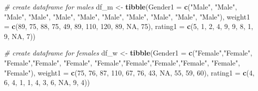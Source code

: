 \documentclass[
]{article}
\newenvironment{Shaded}{\begin{snugshade}}{\end{snugshade}}
\newcommand{\AttributeTok}[1]{\textcolor[rgb]{0.13,0.29,0.53}{#1}}
\newcommand{\CommentTok}[1]{\textcolor[rgb]{0.56,0.35,0.01}{\textit{#1}}}
\newcommand{\ConstantTok}[1]{\textcolor[rgb]{0.56,0.35,0.01}{#1}}
\newcommand{\DecValTok}[1]{\textcolor[rgb]{0.00,0.00,0.81}{#1}}
\newcommand{\FunctionTok}[1]{\textcolor[rgb]{0.13,0.29,0.53}{\textbf{#1}}}
\newcommand{\NormalTok}[1]{#1}
\newcommand{\OtherTok}[1]{\textcolor[rgb]{0.56,0.35,0.01}{#1}}
\newcommand{\StringTok}[1]{\textcolor[rgb]{0.31,0.60,0.02}{#1}}
\begin{document}
\begin{Shaded}
\begin{Highlighting}[]
\CommentTok{\# create dataframe for males}
\NormalTok{df\_m }\OtherTok{\textless{}{-}} \FunctionTok{tibble}\NormalTok{(}\AttributeTok{Gender1 =} \FunctionTok{c}\NormalTok{(}\StringTok{"Male"}\NormalTok{, }\StringTok{"Male"}\NormalTok{, }\StringTok{"Male"}\NormalTok{, }\StringTok{"Male"}\NormalTok{, }\StringTok{"Male"}\NormalTok{, }
                           \StringTok{"Male"}\NormalTok{, }\StringTok{"Male"}\NormalTok{, }\StringTok{"Male"}\NormalTok{, }\StringTok{"Male"}\NormalTok{, }\StringTok{"Male"}\NormalTok{, }\StringTok{"Male"}\NormalTok{),}
               \AttributeTok{weight1 =} \FunctionTok{c}\NormalTok{(}\DecValTok{89}\NormalTok{, }\DecValTok{75}\NormalTok{, }\DecValTok{88}\NormalTok{, }\DecValTok{75}\NormalTok{, }\DecValTok{49}\NormalTok{, }\DecValTok{89}\NormalTok{, }\DecValTok{110}\NormalTok{, }\DecValTok{120}\NormalTok{, }\DecValTok{89}\NormalTok{, }\ConstantTok{NA}\NormalTok{, }\DecValTok{75}\NormalTok{),}
               \AttributeTok{rating1 =} \FunctionTok{c}\NormalTok{(}\DecValTok{5}\NormalTok{, }\DecValTok{1}\NormalTok{, }\DecValTok{2}\NormalTok{, }\DecValTok{4}\NormalTok{, }\DecValTok{9}\NormalTok{, }\DecValTok{9}\NormalTok{, }\DecValTok{8}\NormalTok{, }\DecValTok{1}\NormalTok{, }\DecValTok{9}\NormalTok{, }\ConstantTok{NA}\NormalTok{, }\DecValTok{7}\NormalTok{))}

\CommentTok{\# create dataframe for females}
\NormalTok{df\_w }\OtherTok{\textless{}{-}} \FunctionTok{tibble}\NormalTok{(}\AttributeTok{Gender1 =} \FunctionTok{c}\NormalTok{(}\StringTok{"Female"}\NormalTok{,}\StringTok{"Female"}\NormalTok{, }\StringTok{"Female"}\NormalTok{,}\StringTok{"Female"}\NormalTok{, }\StringTok{"Female"}\NormalTok{,}
                           \StringTok{"Female"}\NormalTok{,}\StringTok{"Female"}\NormalTok{,}\StringTok{"Female"}\NormalTok{,}\StringTok{"Female"}\NormalTok{, }\StringTok{"Female"}\NormalTok{, }\StringTok{"Female"}\NormalTok{),}
               \AttributeTok{weight1 =} \FunctionTok{c}\NormalTok{(}\DecValTok{75}\NormalTok{, }\DecValTok{76}\NormalTok{, }\DecValTok{87}\NormalTok{, }\DecValTok{110}\NormalTok{, }\DecValTok{67}\NormalTok{, }\DecValTok{76}\NormalTok{, }\DecValTok{43}\NormalTok{, }\ConstantTok{NA}\NormalTok{, }\DecValTok{55}\NormalTok{, }\DecValTok{59}\NormalTok{, }\DecValTok{60}\NormalTok{),}
               \AttributeTok{rating1 =} \FunctionTok{c}\NormalTok{(}\DecValTok{4}\NormalTok{, }\DecValTok{6}\NormalTok{, }\DecValTok{4}\NormalTok{, }\DecValTok{1}\NormalTok{, }\DecValTok{1}\NormalTok{, }\DecValTok{4}\NormalTok{, }\DecValTok{3}\NormalTok{, }\DecValTok{6}\NormalTok{, }\ConstantTok{NA}\NormalTok{, }\DecValTok{9}\NormalTok{, }\DecValTok{4}\NormalTok{))}


\end{Highlighting}
\end{Shaded}
\end{document}
